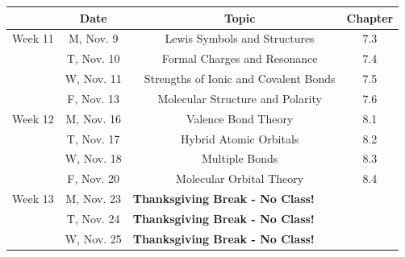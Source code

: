 \documentclass[12pt, letterpaper]{article}
\begin{document}
\noindent
\begin{tabular}{rcccc}
	            & Date       &                                                                                           & Topic                                      & Chapter \\
	\midrule
	Week 11     & M, Nov. 9  &                                                                                           & Lewis Symbols and Structures               & 7.3     \\
	            & T, Nov. 10 &                                                                                           & Formal Charges and Resonance               & 7.4     \\
	            & W, Nov. 11 &                                                                                           & Strengths of Ionic and Covalent Bonds      & 7.5     \\
	            & F, Nov. 13 &                                                                                           & Molecular Structure and Polarity           & 7.6     \\
	\midrule
	Week 12     & M, Nov. 16 &                                                                                           & Valence Bond Theory                        & 8.1     \\
	            & T, Nov. 17 &                                                                                           & Hybrid Atomic Orbitals                     & 8.2     \\
	            & W, Nov. 18 &                                                                                           & Multiple Bonds                             & 8.3     \\
	            & F, Nov. 20 &                                                                                           & Molecular Orbital Theory                   & 8.4     \\
	\midrule
	Week 13     & M, Nov. 23 & \multicolumn{3}{l}{\textbf{Thanksgiving Break - No Class!}}                                                                                      \\
	            & T, Nov. 24 & \multicolumn{3}{l}{\textbf{Thanksgiving Break - No Class!}}                                                                                      \\
	            & W, Nov. 25 & \multicolumn{3}{l}{\textbf{Thanksgiving Break - No Class!}}                                                                                      \\

\end{tabular}
\end{document}

